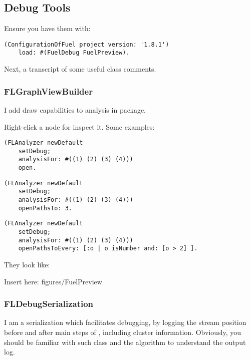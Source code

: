 \documentclass[a4paper,10pt,twoside]{book}
\begin{document}
\subsection{Debug Tools}
Ensure you have them with:

\begin{lstlisting}
(ConfigurationOfFuel project version: '1.8.1') 
    load: #(FuelDebug FuelPreview).
\end{lstlisting}

Next, a transcript of some useful class comments. 

\subsubsection{FLGraphViewBuilder}
I add draw capabilities to analysis in  package.

Right-click a node for inspect it. Some examples:

\begin{lstlisting}
(FLAnalyzer newDefault
    setDebug;
    analysisFor: #((1) (2) (3) (4)))
    open.
\end{lstlisting}

\begin{lstlisting}
(FLAnalyzer newDefault
    setDebug;
    analysisFor: #((1) (2) (3) (4)))
    openPathsTo: 3.
\end{lstlisting}
    
\begin{lstlisting}
(FLAnalyzer newDefault
    setDebug;
    analysisFor: #((1) (2) (3) (4)))
    openPathsToEvery: [:o | o isNumber and: [o > 2] ].
\end{lstlisting}

They look like:

\begin{todo}
Insert here: figures$/$FuelPreview
\end{todo}

\subsubsection{FLDebugSerialization}
I am a serialization which facilitates debugging, by logging the stream position before and after main steps of , including cluster information. Obviously, you should be familiar with such class and the algorithm to understand the output log.
\end{document}
